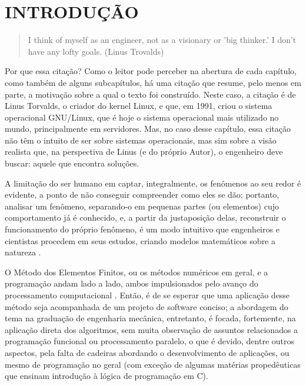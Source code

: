 

\chapter{INTRODUÇÃO}

\begin{quote}
    I think of myself as an engineer, not as a visionary or 'big thinker.' I don't have any lofty goals.
    (Linus Trovalds)  
\end{quote}

Por que essa citação? Como o leitor pode perceber na abertura de cada capítulo, como também de alguns subcapítulos, há uma citação que resume, pelo menos em parte, a motivação sobre a qual o texto foi construído. Neste caso, a citação é de Linus Torvalds, o criador do kernel Linux, e que, em 1991, criou o sistema operacional GNU/Linux, que é hoje o sistema operacional mais utilizado no mundo, principalmente em servidores. Mas, no caso desse capítulo, essa citação não têm o intuito de ser sobre sistemas operacionais, mas sim sobre a visão realista que, na perspectiva de Linus (e do próprio Autor), o engenheiro deve buscar: aquele que encontra soluções.



A limitação do ser humano em captar, integralmente, os fenômenos ao seu redor é evidente, a ponto de não conseguir compreender como eles se dão; portanto, analisar um fenômeno, separando-o em pequenas partes (ou elementos) cujo comportamento já é conhecido, e, a partir da justaposição delas, reconstruir o funcionamento do próprio fenômeno, é um modo intuitivo que engenheiros e cientistas procedem em seus estudos, criando modelos matemáticos sobre a natureza \cite{Zin}.


O Método dos Elementos Finitos, ou os métodos numéricos em geral, e a programação andam lado a lado, ambos impulsionados pelo avanço do processamento computacional \cite{Onate}. Então, é de se esperar que uma aplicação desse método seja acompanhada de um projeto de software conciso; a abordagem do tema na graduação de engenharia mecânica, entretanto, é focada, fortemente, na aplicação direta dos algoritmos, sem muita observação de assuntos relacionados a programação funcional ou processamento paralelo, o que é devido, dentre outros aspectos, pela falta de cadeiras abordando o desenvolvimento de aplicações, ou mesmo de programação no geral (com exceção de algumas matérias propedêuticas que ensinam introdução à lógica de programação em C).


